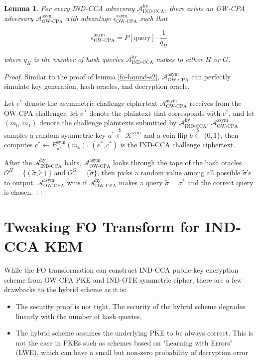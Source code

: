 \documentclass{article}
\newcommand{\leftsample}{\overset{{\scriptscriptstyle\$}}{\leftarrow}}
\newtheorem{lemma}{Lemma}
\begin{document}
\begin{lemma}
    For every IND-CCA adversray $\mathcal{A}^\text{hy}_\text{IND-CCA}$, there exists an OW-CPA adversary $\mathcal{A}^\text{asym}_\text{OW-CPA}$ with advantage $\epsilon^\text{asym}_\text{OW-CPA}$ such that

    $$
    \epsilon^\text{asym}_\text{OW-CPA} = P[\text{query}] \cdot \frac{1}{q_H}
    $$

    where $q_H$ is the number of hash queries $\mathcal{A}^\text{hy}_\text{IND-CCA}$ makes to either $H$ or $G$.
\end{lemma}

\begin{proof}
    Similar to the proof of lemma \ref{fo-bound-s2}, $\mathcal{A}^\text{asym}_\text{OW-CPA}$ can perfectly simulate key generation, hash oracles, and decryption oracle.

    Let $e^\ast$ denote the asymmetric challenge ciphertext $\mathcal{A}^\text{asym}_\text{OW-CPA}$ receives from the OW-CPA challenger, let $\sigma^\ast$ denote the plaintext that corresponds with $e^\ast$, and let $(m_0, m_1)$ denote the challenge plaintexts submitted by $\mathcal{A}^\text{hy}_\text{IND-CCA}$. $\mathcal{A}^\text{asym}_\text{OW-CPA}$ samples a random symmetric key $a^\ast \leftsample \mathcal{K}^\text{sym}$ and a coin flip $b \leftsample \{0, 1\}$, then computes $c^\ast \leftarrow E^\text{sym}_{a^\ast}(m_b)$. $(e^\ast, c^\ast)$ is the IND-CCA challenge ciphertext.

    After the $\mathcal{A}^\text{hy}_\text{IND-CCA}$ halts, $\mathcal{A}^\text{asym}_\text{OW-CPA}$ looks through the tape of the hash oracles $\mathcal{O}^H = \{(\tilde{\sigma}, \tilde{c})\}$ and $\mathcal{O}^G = \{\tilde{\sigma}\}$, then picks a random value among all possible $\tilde{\sigma}$'s to output. $\mathcal{A}^\text{asym}_\text{OW-CPA}$ wins if $\mathcal{A}^\text{hy}_\text{OW-CPA}$ makes a query $\tilde{\sigma} = \sigma^\ast$ and the correct query is chosen.
\end{proof}

\section{Tweaking FO Transform for IND-CCA KEM}
While the FO transformation can construct IND-CCA public-key encryption scheme from OW-CPA PKE and IND-OTE symmetric cipher, there are a few drawbacks to the hybrid scheme as it is:

\begin{itemize}
    \item The security proof is not tight. The security of the hybrid scheme degrades linearly with the number of hash queries.
    \item The hybrid scheme assumes the underlying PKE to be always correct. This is not the case in PKEs such as schemes based on "Learning with Errors" (LWE), which can have a small but non-zero probability of decryption error
\end{itemize}
\end{document}
